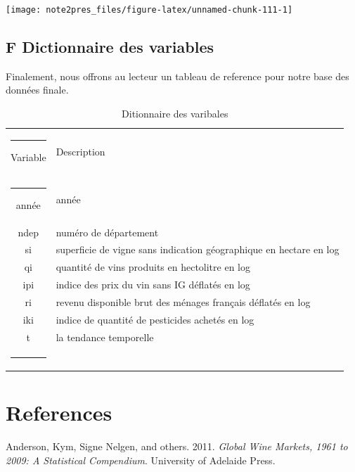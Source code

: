 \documentclass[11pt,]{article}
\begin{document}
\begin{center}\texttt{[image: note2pres\_files/figure-latex/unnamed-chunk-111-1]} \end{center}

\FloatBarrier

\newpage

\hypertarget{f-dictionnaire-des-variables}{%
\subsection{F Dictionnaire des
variables}\label{f-dictionnaire-des-variables}}

Finalement, nous offrons au lecteur un tableau de reference pour notre
base des données finale.

\FloatBarrier

\begin{table}[!htbp]
  \centering
\caption{Ditionnaire des varibales}
\begin{tabular}{c|l}
  \noindent\rule[0.5ex]{\linewidth}{1pt}
  Variable & Description \\
  \noindent\rule[0.5ex]{\linewidth}{1pt}
année & année \\
ndep & numéro de département \\
si & superficie de vigne sans indication géographique en hectare en log \\
qi & quantité de vins produits en hectolitre en log \\
ipi & indice des prix du vin sans IG déflatés en log  \\
ri & revenu disponible brut des ménages français déflatés en log \\
iki & indice de quantité de pesticides achetés en log \\
t & la tendance temporelle \\
\noindent\rule[0.5ex]{\linewidth}{1pt}
\end{tabular}
\end{table}

\FloatBarrier

\newpage

\hypertarget{references}{%
\section*{References}\label{references}}

\hypertarget{refs}{}
\leavevmode\hypertarget{ref-anderson2011global}{}%
Anderson, Kym, Signe Nelgen, and others. 2011. \emph{Global Wine
Markets, 1961 to 2009: A Statistical Compendium}. University of Adelaide
Press.
\end{document}
